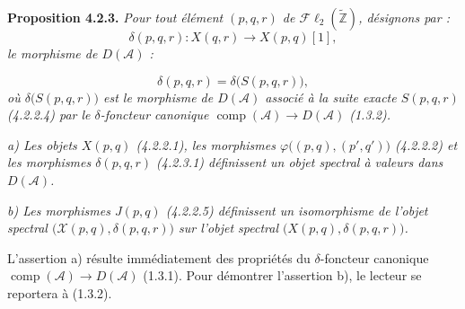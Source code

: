 \medskip\noindent\textbf{Proposition 4.2.3.}\quad
\textit{Pour tout élément $(p,q,r)$ de
$\mathcal{F}\ell_2(\widetilde{\mathbb Z})$, désignons par :}
\[
\delta(p,q,r)\colon X(q,r)\longrightarrow X(p,q)[1],
\]
\noindent\textit{le morphisme de $D(\mathcal A)$ :}

\begin{equation}
\delta(p,q,r)=\delta\bigl(S(p,q,r)\bigr),
\tag{4.2.3.1}
\end{equation}
\noindent\textit{où $\delta\bigl(S(p,q,r)\bigr)$ est le morphisme de
$D(\mathcal A)$ associé à la suite exacte $S(p,q,r)$ (4.2.2.4) par le
$\delta$-foncteur canonique
$\operatorname{comp}(\mathcal A)\longrightarrow D(\mathcal A)$ (1.3.2).}

\noindent\textit{a) Les objets $X(p,q)$ (4.2.2.1), les morphismes
$\varphi\bigl((p,q),(p',q')\bigr)$ (4.2.2.2) et les morphismes
$\delta(p,q,r)$ (4.2.3.1) définissent un objet spectral à valeurs dans
$D(\mathcal A)$.}

\noindent\textit{b) Les morphismes $J(p,q)$ (4.2.2.5) définissent un
isomorphisme de l'objet spectral
$\bigl(\mathcal X(p,q),\delta(p,q,r)\bigr)$ sur l'objet spectral
$\bigl(X(p,q),\delta(p,q,r)\bigr)$.}

L'assertion a) résulte immédiatement des propriétés du $\delta$-foncteur
canonique
$\operatorname{comp}(\mathcal A)\longrightarrow D(\mathcal A)$ (1.3.1).
Pour démontrer l'assertion b), le lecteur se reportera à (1.3.2).
\endgroup
